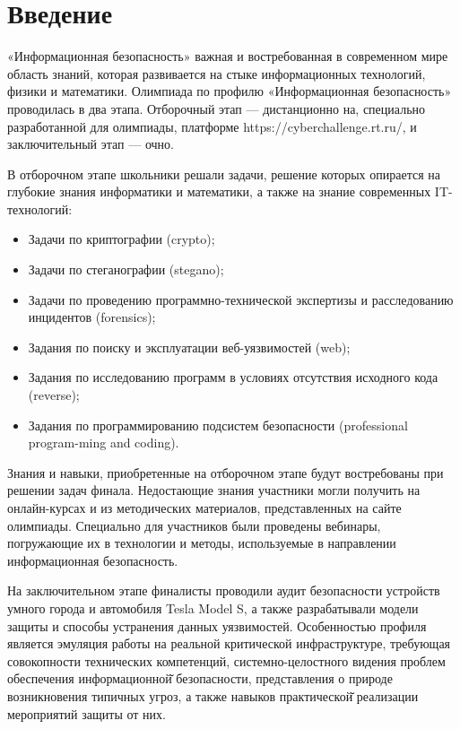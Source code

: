 %

\begingroup
\pagestyle{empty}

\section*{Введение}

«Информационная безопасность» важная и востребованная в современном мире область знаний, которая развивается на стыке информационных технологий, физики и математики. Олимпиада по профилю «Информационная безопасность» проводилась в два этапа. Отборочный этап — дистанционно на, специально разработанной для олимпиады, платформе https://cyberchallenge.rt.ru/, и заключительный этап — очно. 

В отборочном этапе школьники решали задачи, решение которых опирается на глубокие знания информатики и математики, а также на знание современных IT-технологий:
\begin{itemize}    
    \item Задачи по криптографии (crypto);
    \item Задачи по стеганографии (stegano);
    \item Задачи по проведению программно-технической экспертизы и расследованию инцидентов (forensics);
    \item Задания по поиску и эксплуатации веб-уязвимостей (web);
    \item Задания по исследованию программ в условиях отсутствия исходного кода (reverse);
    \item Задания по программированию подсистем безопасности (professional program-ming and coding).
\end{itemize}    

Знания и навыки, приобретенные на отборочном этапе будут востребованы при решении задач финала. Недостающие знания участники могли получить на онлайн-курсах и из методических материалов, представленных на сайте олимпиады.  Специально для участников были проведены вебинары, погружающие их в технологии и методы, используемые в направлении информационная безопасность. 

На заключительном этапе финалисты проводили аудит безопасности устройств умного города и автомобиля Tesla Model S, а также разрабатывали модели защиты и способы устранения данных уязвимостей. Особенностью профиля является эмуляция работы на реальной критической инфраструктуре, требующая совокопности технических компетенций, системно-целостного видения проблем обеспечения информационной̆ безопасности, представления о природе возникновения типичных угроз, а также навыков практической̆ реализации мероприятий защиты от них.

\clearpage
\endgroup